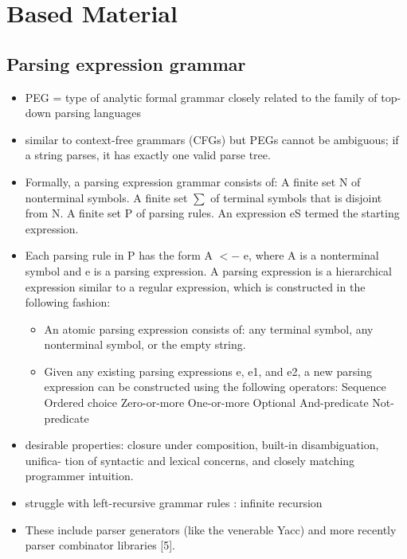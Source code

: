 \chapter{Based Material}
	\section{Parsing expression grammar} 

\begin{itemize}
	\item PEG = type of analytic formal grammar closely related to the family of top-down parsing languages
	\item similar to context-free grammars (CFGs) but PEGs cannot be ambiguous; if a string parses, it has exactly one valid parse tree.
	\item Formally, a parsing expression grammar consists of: A finite set N of nonterminal symbols. A finite set $\sum$ of terminal symbols that is disjoint from N. A finite set P of parsing rules. An expression eS termed the starting expression.
	\item Each parsing rule in P has the form A $<-$ e, where A is a nonterminal symbol and e is a parsing expression. A parsing expression is a hierarchical expression similar to a regular expression, which is constructed in the following fashion:  
	\begin{itemize}
		\item An atomic parsing expression consists of: any terminal symbol, any nonterminal symbol, or the empty string.
		\item Given any existing parsing expressions e, e1, and e2, a new parsing expression can be constructed using the following operators: Sequence Ordered choice Zero-or-more One-or-more Optional And-predicate Not-predicate
	\end{itemize}
	\item desirable properties: closure under composition, built-in disambiguation, unifica- tion of syntactic and lexical concerns, and closely matching programmer intuition.
	\item struggle with left-recursive grammar rules : infinite recursion
	\item  These include parser generators (like the venerable Yacc) and more recently parser combinator libraries [5].
\end{itemize}

